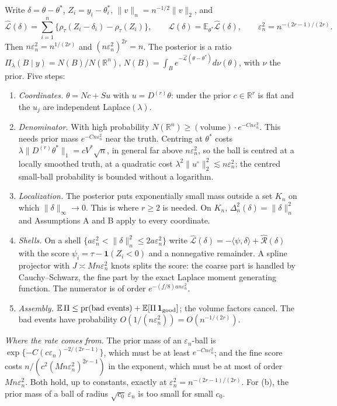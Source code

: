 \documentclass[11pt]{article}
\theoremstyle{definition}
\theoremstyle{remark}
\newcommand{\R}{\mathbb{R}}
\newcommand{\E}{\mathbb{E}}
\newcommand{\pr}{\mathrm{pr}}
\newcommand{\Dr}{D^{(r)}}
\newcommand{\thetas}{\theta^{*}}
\newcommand{\en}{\varepsilon_n}
\newcommand{\Lh}{\widehat{\mathcal L}}
\newcommand{\Lm}{\mathcal L}
\newcommand{\Rh}{\widehat{\mathcal R}}
\newcommand{\fl}{\underline f}
\newcommand{\nn}[1]{\|#1\|_n}
\newcommand{\ind}{\mathbf 1}
\begin{document}
Write $\delta=\theta-\thetas$, $Z_i=y_i-\thetas_i$, $\nn{v}=n^{-1/2}\|v\|_2$, and
\[
\Lh(\delta)=\sum_{i=1}^n\{\rho_\tau(Z_i-\delta_i)-\rho_\tau(Z_i)\},\qquad \Lm(\delta)=\E_{\thetas}\Lh(\delta),\qquad \en^2=n^{-(2r-1)/(2r)}.
\]
Then $n\en^2=n^{1/(2r)}$ and $(n\en^2)^{2r}=n$. The posterior is a ratio $\Pi_\lambda(B\mid y)=N(B)/N(\R^n)$, $N(B)=\int_Be^{-\Lh(\theta-\thetas)}d\nu(\theta)$, with $\nu$ the prior. Five steps:
\begin{enumerate}[itemsep=2pt,topsep=3pt,label=\textbf{\arabic*.},leftmargin=*]
\item \emph{Coordinates.} $\theta=Nc+Su$ with $u=\Dr\theta$: under the prior $c\in\R^r$ is flat and the $u_j$ are independent Laplace$(\lambda)$.
\item \emph{Denominator.} With high probability $N(\R^n)\ge(\text{volume})\cdot e^{-Cn\en^2}$. This needs prior mass $e^{-Cn\en^2}$ near the truth. Centring at $\thetas$ costs $\lambda\|\Dr\thetas\|_1=cV^{*}\sqrt n$, in general far above $n\en^2$, so the ball is centred at a locally smoothed truth, at a quadratic cost $\lambda^2\|u^\circ\|_2^2\lesssim n\en^2$; the centred small-ball probability is bounded without a logarithm.
\item \emph{Localization.} The posterior puts exponentially small mass outside a set $K_n$ on which $\|\delta\|_\infty\to0$. This is where $r\ge2$ is needed. On $K_n$, $\Delta_n^2(\delta)=\nn{\delta}^2$ and Assumptions A and B apply to every coordinate.
\item \emph{Shells.} On a shell $\{a\en^2<\nn{\delta}^2\le2a\en^2\}$ write $\Lh(\delta)=-\langle\psi,\delta\rangle+\Rh(\delta)$ with the score $\psi_i=\tau-\ind(Z_i<0)$ and a nonnegative remainder. A spline projector with $J\asymp Mn\en^2$ knots splits the score: the coarse part is handled by Cauchy--Schwarz, the fine part by the exact Laplace moment generating function. The numerator is of order $e^{-(\fl/8)an\en^2}$.
\item \emph{Assembly.} $\E\,\Pi\le\pr(\text{bad events})+\E[\Pi\,\ind_{\rm good}]$; the volume factors cancel. The bad events have probability $O(1/(n\en^2))=O(n^{-1/(2r)})$.
\end{enumerate}
\emph{Where the rate comes from.} The prior mass of an $\en$-ball is $\exp\{-C(c\en)^{-2/(2r-1)}\}$, which must be at least $e^{-Cn\en^2}$; and the fine score costs $n/(c^2(Mn\en^2)^{2r-1})$ in the exponent, which must be at most of order $Mn\en^2$. Both hold, up to constants, exactly at $\en^2=n^{-(2r-1)/(2r)}$. For (b), the prior mass of a ball of radius $\sqrt{c_0}\,\en$ is too small for small $c_0$.
\end{document}
